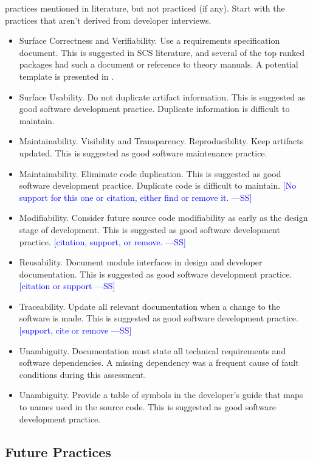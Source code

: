 \documentclass[final, 3p, times, authoryear]{elsarticle}
\newcommand{\authornote}[3]{\textcolor{#1}{[#3 ---#2]}}
\newcommand{\authornote}[3]{}
\newcommand{\wss}[1]{\authornote{blue}{SS}{#1}} %
\begin{document}
practices mentioned in literature, but not practiced (if any).  Start with the
practices that aren't derived from developer interviews.

\begin{itemize}
	\item Surface Correctness and Verifiability. Use a requirements
	specification document. This is suggested in SCS literature, and several of
	the top ranked packages had such a document or reference to theory manuals.
	A potential template is presented in \citep{smith2005new}. 
	\item Surface Usability. Do not duplicate artifact information. This is
	suggested as good software development practice. Duplicate information is
	difficult to maintain. 
	\item Maintainability. Visibility and Transparency. Reproducibility. Keep
	artifacts updated. This is suggested as good software maintenance practice.
	\item Maintainability. Eliminate code duplication. This is suggested as good
	software development practice. Duplicate code is difficult to maintain.
	\wss{No support for this one or citation, either find or remove it.}
	\item Modifiability. Consider future source code modifiability as early as
	the design stage of development. This is suggested as good software
	development practice. \wss{citation, support, or remove.}
	\item Reusability. Document module interfaces in design and developer
	documentation. This is suggested as good software development practice.
	\wss{citation or support}
	\item Traceability. Update all relevant documentation when a change to the
	software is made. This is suggested as good software development practice.
	\wss{support, cite or remove}
	\item Unambiguity. Documentation must state all technical requirements and
	software dependencies. A missing dependency was a frequent cause of fault
	conditions during this assessment.
	\item Unambiguity. Provide a table of symbols in the developer's guide that
	maps to names used in the source code. This is suggested as good software
	development practice.

\end{itemize}	

\subsection{Future Practices} \label{futurePractices}
\end{document}
